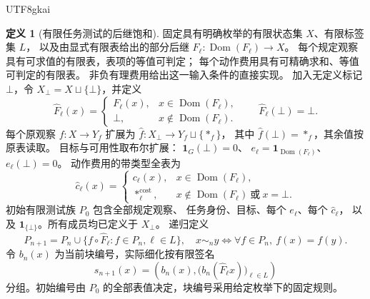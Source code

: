 \documentclass[12pt,a4paper,openany,notitlepage]{report}
\theoremstyle{plain}
\theoremstyle{definition}
\newtheorem{definition}[theorem]{定义}
\theoremstyle{remark}
\def\mathcal#1{#1}\def\mathsf#1{#1}\def\mathbb#1{#1}%
\begin{document}
\begin{CJK*}{UTF8}{gkai}
\begin{definition}[有限任务测试的后继饱和]
\label{hgov:def:saturation}
固定具有明确枚举的有限状态集 $X$、有限标签集 $L$，
以及由显式有限表给出的部分后继
$F_\ell:\operatorname{Dom}(F_\ell)\to X$。
每个规定观察具有可求值的有限表，表项的等值可判定；
每个动作费用具有可精确求和、等值可判定的有限表。
非负有理费用给出这一输入条件的直接实现。
加入无定义标记 $\bot$，令 $X_\bot=X\sqcup\{\bot\}$，并定义
\[
 \widehat F_\ell(x)=
 \begin{cases}
 F_\ell(x),&x\in\operatorname{Dom}(F_\ell),\\
 \bot,&x\notin\operatorname{Dom}(F_\ell).
 \end{cases}
 \qquad \widehat F_\ell(\bot)=\bot.
\]
每个原观察 $f:X\to Y_f$ 扩展为
$\widehat f:X_\bot\to Y_f\sqcup\{*_f\}$，
其中 $\widehat f(\bot)=*_f$，其余值按原表读取。
目标与可用性取布尔扩展：
$\mathbf1_G(\bot)=0$、
$e_\ell=\mathbf1_{\operatorname{Dom}(F_\ell)}$、
$e_\ell(\bot)=0$。
动作费用的带类型全表为
\[
 \widehat c_\ell(x)=
 \begin{cases}
 c_\ell(x),&x\in\operatorname{Dom}(F_\ell),\\
 *_\ell^{\mathrm{cost}},&x\notin\operatorname{Dom}(F_\ell)
 \ \text{或}\ x=\bot.
 \end{cases}
\]
初始有限测试族 $\mathcal P_0$ 包含全部规定观察、
任务身份、目标、每个 $e_\ell$、每个 $\widehat c_\ell$，
以及 $\mathbf1_{\{\bot\}}$。所有成员均已定义于 $X_\bot$。
递归定义
\[
\mathcal P_{n+1}
=\mathcal P_n\cup\{f\circ\widehat F_\ell:
f\in\mathcal P_n,\ell\in L\},
\quad
x\sim_ny\iff\forall f\in\mathcal P_n,\ f(x)=f(y).
\]
令 $b_n(x)$ 为当前块编号，实际细化按有限签名
\[
 s_{n+1}(x)=
 \left(b_n(x),\bigl(b_n(\widehat F_\ell x)\bigr)_{\ell\in L}\right)
\]
分组。初始编号由 $\mathcal P_0$ 的全部表值决定，块编号采用给定枚举下的固定规则。
\end{definition}


\end{CJK*}
\end{document}
